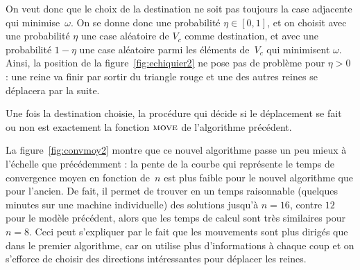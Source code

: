 
On veut donc que le choix de la destination ne soit pas toujours la case adjacente qui minimise~$\omega$. On se donne donc une probabilité $\eta \in [0,1]$, et on choisit avec une probabilité $\eta$ une case aléatoire de $V_c$ comme destination, et avec une probabilité $1 - \eta$ une case aléatoire parmi les éléments de~$V_c$ qui minimisent $\omega$. Ainsi, la position de la figure~\ref{fig:echiquier2} ne pose pas de problème pour $\eta > 0$ : une reine va finir par sortir du triangle rouge et une des autres reines se déplacera par la suite.

Une fois la destination choisie, la procédure qui décide si le déplacement se fait ou non est exactement la fonction $\textsc{move}$ de l'algorithme précédent.



        
    

La figure~\ref{fig:convmoy2} montre que ce nouvel algorithme passe un peu mieux à l'échelle que précédemment : la pente de la courbe qui représente le temps de convergence moyen en fonction de~$n$ est plus faible pour le nouvel algorithme que pour l'ancien. De fait, il permet de trouver en un temps raisonnable (quelques minutes sur une machine individuelle) des solutions jusqu'à $n=16$, contre $12$ pour le modèle précédent, alors que les temps de calcul sont très similaires pour $n=8$. Ceci peut s'expliquer par le fait que les mouvements sont plus dirigés que dans le premier algorithme, car on utilise plus d'informations à chaque coup et on s'efforce de choisir des directions intéressantes pour déplacer les reines.


